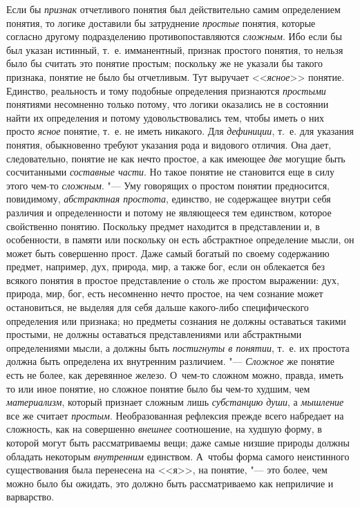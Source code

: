 {Если бы {\em признак}
отчетливого понятия был действительно самим определением
понятия, то логике доставили бы затруднение
{\em простые} понятия,
которые согласно другому подразделению противопоставляются
{\em сложным}. Ибо если
бы был указан истинный, т.~е. имманентный, признак простого понятия, то
нельзя было бы считать это понятие простым; поскольку же не указали бы
такого признака, понятие не было бы отчетливым. Тут выручает
<<{\em ясное}>> понятие.
Единство, реальность и тому подобные определения признаются
{\em простыми} понятиями
несомненно только потому, что логики оказались не в состоянии найти их
определения и потому удовольствовались тем, чтобы иметь о них просто
{\em ясное} понятие,
т.~е. не иметь никакого. Для
{\em дефиниции}, т.~е.
для указания понятия, обыкновенно требуют указания рода и видового отличия.
Она дает, следовательно, понятие не как нечто простое, а как имеющее
{\em две} могущие быть
сосчитанными {\em составные части}.
Но такое понятие не становится еще в силу этого чем-то
{\em сложным}. "--- Уму
говорящих о простом понятии предносится, повидимому,
{\em абстрактная простота},
единство, не содержащее внутри себя различия и определенности
и потому не являющееся тем единством, которое свойственно понятию.
Поскольку предмет находится в представлении и, в особенности, в памяти или
поскольку он есть абстрактное определение мысли, он может быть совершенно
прост. Даже самый богатый по своему содержанию предмет, например, дух,
природа, мир, а также бог, если он облекается без всякого понятия в простое
представление о столь же простом выражении: дух, природа, мир, бог, есть
несомненно нечто простое, на чем сознание может остановиться, не выделяя
для себя дальше какого-либо специфического определения или признака; но
предметы сознания не должны оставаться такими простыми, не должны
оставаться представлениями или абстрактными определениями мысли, а должны
быть {\em постигнуты в понятии},
т.~е. их простота должна быть определена их внутренним
различием. "--- {\em Сложное}
же понятие есть не более, как деревянное железо. О~чем-то
сложном можно, правда, иметь то или иное понятие, но сложное понятие было
бы чем-то худшим, чем
{\em материализм},
который признает сложным лишь
{\em субстанцию души}, а
{\em мышление} все же
считает {\em простым}.
Необразованная рефлексия прежде всего набредает на сложность,
как на совершенно {\em внешнее}
соотношение, на худшую форму, в которой могут быть
рассматриваемы вещи; даже самые низшие природы должны обладать некоторым
{\em внутренним}
единством. А~чтобы форма самого неистинного существования
была перенесена на <<я>>, на понятие, "--- это более, чем можно
было бы ожидать, это должно быть рассматриваемо как
неприличие и варварство.

}
